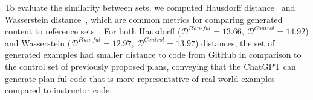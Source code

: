 

To evaluate the similarity between sets, we computed Hausdorff distance~\cite{tahaEfficientAlgorithmCalculating2015} and Wasserstein distance~\cite{ramdasWassersteinTwoSample2015}, which are common metrics for comparing generated content to reference sets~\cite{pmlr-v70-arjovsky17a, weilihausdorff}. For both Hausdorff (\(\mathcal{D}^{\textit{Plan-ful}}=13.66\), \(\mathcal{D}^{\textit{Control}}=14.92\)) and Wasserstein (\(\mathcal{D}^{\textit{Plan-ful}}=12.97\), \(\mathcal{D}^{\textit{Control}}=13.97\)) distances, the set of generated examples had smaller distance to code from GitHub in comparison to the control set of previously proposed plans, conveying that the ChatGPT can generate plan-ful code that is more representative of real-world examples compared to instructor code.


